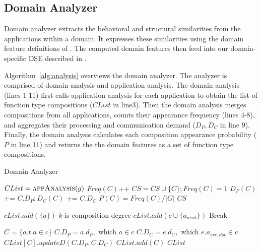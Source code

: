 \subsection{Domain Analyzer}
\label{sec:analyzer} 

Domain analyzer extracts the behavioral and structural similarities from the applications within a domain. It expresses these similarities using the domain feature definitions of . The computed domain features then feed into our domain-specific DSE described in .

Algorithm~\ref{alg:analysis} overviews the domain analyzer. The analyzer is comprised of domain analysis and application analysis. The domain analysis (lines 1-11) first calls application analysis for each application to obtain the list of function type compositions ($CList$ in line3). Then the domain analysis merges compositions from all applications, counts their appearance frequency (lines 4-8), and aggregates their processing and communication demand ($D_P, D_C$ in line 9). Finally, the domain analysis calculates each composition appearance probability ($P$ in line 11) and returns the the domain features as a set of function type compositions.

\begin{algorithm}
\caption{Domain Analyzer}
\label{alg:analysis}
\begin{algorithmic}[1]
{\footnotesize
{}
		\State $CList = \Call{appAnalysis}{g}$
					\State $Freq(C)$++
				\Else
					\State $CS = CS \cup \{C\}; Freq(C) = 1$
				\EndIf
				\State $D_{P}(C)$ += $C.D_{P}; D_{C}(C)$ += $C.D_{C}$
		\EndFor
	\EndFor
		\State $P(C) = Freq(C) / \left\vert{G}\right\vert$
	\EndFor
	\Return $CS$
\EndFunction
\item[]
		\State $cList.add( \{a\} )$
	\EndFor
	\Comment $k$ is composition degree
					\State $cList.add( c \cup \{a_{next}\} )$
				\EndIf
			\EndFor
		\EndFor
		 Break
	\EndFor

			\State $C$ = \{$a.t \vert a \in c$\}
			 $C.D_{P} = a.d_{P},$ which $a \in c$
			 $C.D_{C} = e.d_{C},$ which $ e.a_{src,dst} \in c$
				\State $CList[C].updateD(C.D_{P},C.D_{C})$
			\Else
				\State $CList.add(C)$
			\EndIf
	\EndFor
	\Return $CList$
\EndFunction
}
\end{algorithmic}
\end{algorithm}

